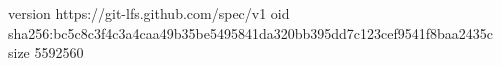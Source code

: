 version https://git-lfs.github.com/spec/v1
oid sha256:bc5c8c3f4c3a4caa49b35be5495841da320bb395dd7c123cef9541f8baa2435c
size 5592560
